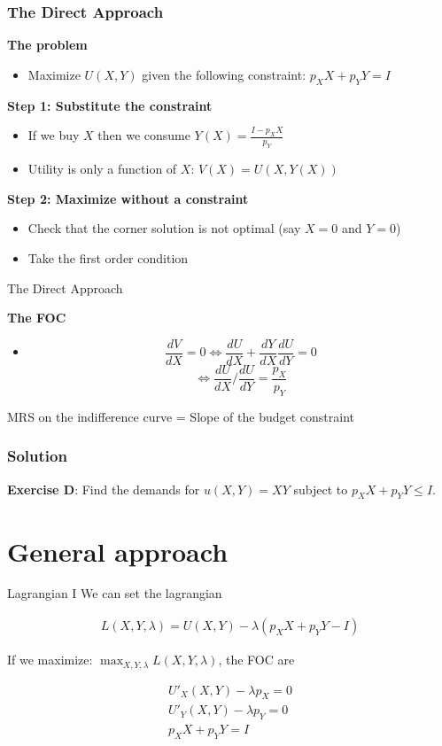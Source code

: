 \documentclass[handout]{beamer}
\begin{document}
\begin{frame}\frametitle{The Direct Approach}

\textbf{The problem}
\begin{itemize}
\item Maximize $U(X,Y)$ given the following constraint: $p_X X+ p_YY = I$
\end{itemize}

\pause
\textbf{Step 1: Substitute the constraint}
\begin{itemize}
\item If we buy $X$ then we consume $Y(X) = \frac{I - p_X X}{p_Y}$
\item Utility is only a function of $X$: $V(X) = U(X,Y(X))$
\end{itemize}

\pause

\textbf{Step 2: Maximize without a constraint}
\begin{itemize}
\item Check that the corner solution is not optimal (say $X= 0$ and $Y=0$)
\item Take the first order condition 
\end{itemize}
\end{frame}

\begin{frame}{The Direct Approach}

\textbf{The FOC}
\begin{itemize}
\item $$\frac{dV}{dX} = 0 \iff \frac{dU}{dX} + \frac{dY}{dX}\frac{dU}{dY} = 0$$
 $$\iff \frac{dU}{dX}\Bigg/\frac{dU}{dY} = \frac{p_X}{p_Y}$$
\end{itemize}
MRS on the indifference curve = Slope of the budget constraint
\end{frame}

\begin{frame}\frametitle{Solution}

\textbf{Exercise D}: Find the demands for $u(X,Y) = XY$ subject to $p_X X + p_Y Y \le I $. 
\end{frame}

\section{General approach}

\begin{frame}{Lagrangian I}
We can set the lagrangian

\begin{align*}
L(X,Y,\lambda) = U(X,Y) - \lambda (p_X X + p_Y Y - I)
\end{align*}

\pause

If we maximize: $\max_{X,Y,\lambda} L(X,Y,\lambda)$, the FOC are

\pause

\begin{align*}
U'_X(X,Y) - \lambda p_X = 0 \\
U'_Y(X,Y) - \lambda p_Y = 0 \\
p_X X + p_Y Y = I
\end{align*}
\end{frame}
\end{document}

